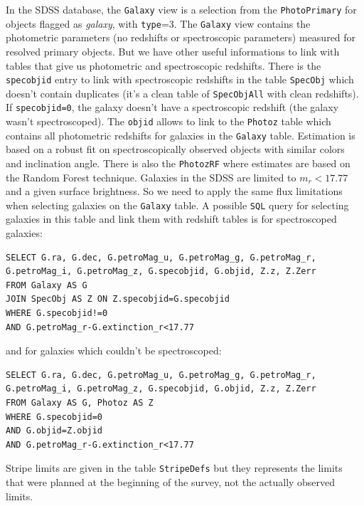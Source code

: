 In the SDSS database, the \texttt{Galaxy} view is a selection from the
\texttt{PhotoPrimary} for objects flagged as \emph{galaxy}, with
\texttt{type}=3. The \texttt{Galaxy} view contains the photometric parameters
(no redshifts or spectroscopic parameters) measured for resolved primary
objects. But we have other useful informations to link with tables that give us
photometric and spectroscopic redshifts. There is the \texttt{specobjid} entry
to link with spectroscopic redshifts in the table \texttt{SpecObj} which
doesn't contain duplicates (it's a clean table of \texttt{SpecObjAll} with
clean redshifts). If \texttt{specobjid=0}, the galaxy doesn't have a
spectroscopic redshift (the galaxy wasn't spectroscoped). The \texttt{objid}
allows to link to the \texttt{Photoz} table which contains all photometric
redshifts for galaxies in the \texttt{Galaxy} table. Estimation is based on a
robust fit on spectroscopically observed objects with similar colors and
inclination angle. There is also the \texttt{PhotozRF} where estimates are
based on the Random Forest technique. Galaxies in the SDSS are limited to
$m_r<17.77$ and a given surface brightness. So we need to apply the same flux
limitations when selecting galaxies on the \texttt{Galaxy} table. A possible
\texttt{SQL} query for selecting galaxies in this table and link them with
redshift tables is for spectroscoped galaxies:
%
\begin{listing}[H]
    \begin{verbatim}
SELECT G.ra, G.dec, G.petroMag_u, G.petroMag_g, G.petroMag_r,
G.petroMag_i, G.petroMag_z, G.specobjid, G.objid, Z.z, Z.Zerr
FROM Galaxy AS G
JOIN SpecObj AS Z ON Z.specobjid=G.specobjid
WHERE G.specobjid!=0
AND G.petroMag_r-G.extinction_r<17.77
    \end{verbatim}
\end{listing}
%
and for galaxies which couldn't be spectroscoped:
%
\begin{listing}[H]
    \begin{verbatim}
SELECT G.ra, G.dec, G.petroMag_u, G.petroMag_g, G.petroMag_r,
G.petroMag_i, G.petroMag_z, G.specobjid, G.objid, Z.z, Z.Zerr
FROM Galaxy AS G, Photoz AS Z
WHERE G.specobjid=0
AND G.objid=Z.objid
AND G.petroMag_r-G.extinction_r<17.77
    \end{verbatim}
\end{listing}

Stripe limits are given in the table \texttt{StripeDefs} but they represents
the limits that were planned at the beginning of the survey, not the actually
observed limits.

